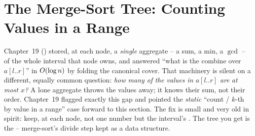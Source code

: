 \section{The Merge-Sort Tree: Counting Values in a Range}\label{sec:c19-mst}

\begin{previouslybox}
Chapter~19 () stored, at each node, a \emph{single} aggregate -- a sum, a min, a \(\gcd\) -- of the whole interval that node owns, and answered ``what is the combine over \(a[l..r]\)'' in \(O(\log n)\) by folding the canonical cover.  That machinery is silent on a different, equally common question: \emph{how many of the values in \(a[l..r]\) are at most \(x\)?}  A lone aggregate throws the values away; it knows their sum, not their order.  Chapter~19 flagged exactly this gap and pointed the \emph{static} ``count / \(k\)-th by value in a range'' case forward to this section.  The fix is small and very old in spirit: keep, at each node, not one number but the interval's .  The tree you get is the  -- merge-sort's divide step kept as a data structure.
\end{previouslybox}


